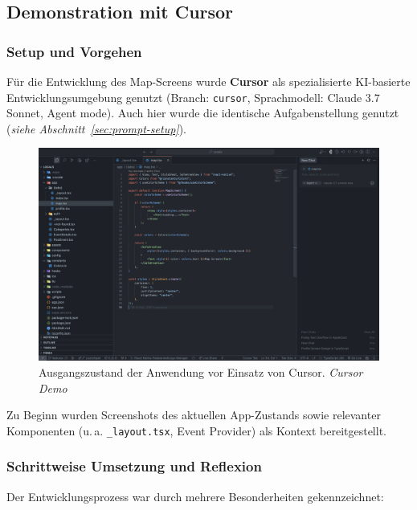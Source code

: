\subsection{Demonstration mit Cursor}

\subsubsection{Setup und Vorgehen}
Für die Entwicklung des Map-Screens wurde \textbf{Cursor} als spezialisierte
KI-basierte Entwicklungsumgebung genutzt (Branch: \texttt{cursor},
Sprachmodell: Claude 3.7 Sonnet, Agent mode). Auch hier wurde die identische
Aufgabenstellung genutzt (\emph{siehe Abschnitt~\ref{sec:prompt-setup}}).

\begin{figure}[htbp]
      \centering
      \vspace{1em}
      \includegraphics[width=1\textwidth]{images/cursor_screenshots/Screenshots Ist-Zustand-cursor.png}
      \caption{Ausgangszustand der Anwendung vor Einsatz von Cursor. \textit{Cursor Demo}}
      \label{fig:cursor-istzustand}
\end{figure}

Zu Beginn wurden Screenshots des aktuellen App-Zustands sowie relevanter
Komponenten (u.\,a. \texttt{\_layout.tsx}, Event Provider) als Kontext
bereitgestellt.

\subsubsection{Schrittweise Umsetzung und Reflexion}

Der Entwicklungsprozess war durch mehrere Besonderheiten gekennzeichnet:

